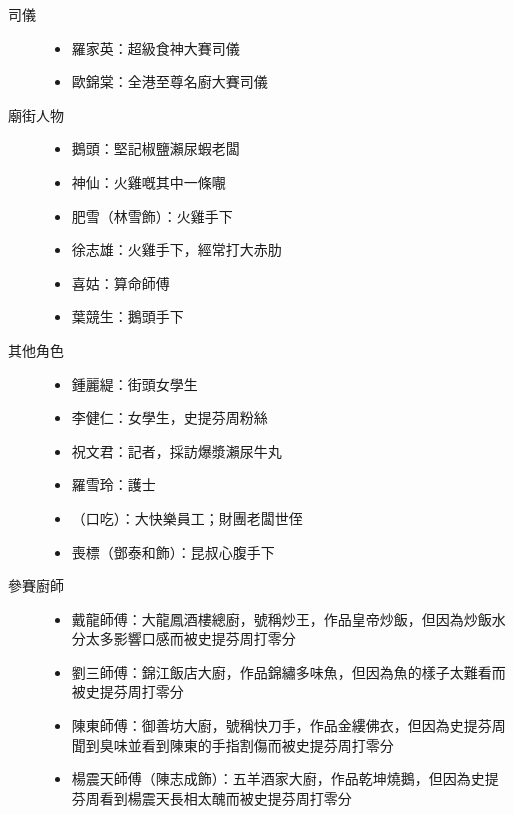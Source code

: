 \begin{description}
\item[司儀]\mbox{}\par
\begin{itemize}
\item 羅家英：超級食神大賽司儀
\item 歐錦棠：全港至尊名廚大賽司儀
\end{itemize}

\item[廟街人物]\mbox{}\par
\begin{itemize}
\item 鵝頭：堅記椒鹽瀨尿蝦老闆
\item 神仙：火雞嘅其中一條𡃁
\item 肥雪（林雪飾）：火雞手下
\item 徐志雄：火雞手下，經常打大赤肋
\item 喜姑：算命師傅
\item 葉競生：鵝頭手下
\end{itemize}

\item[其他角色]\mbox{}\par
\begin{itemize}
\item 鍾麗緹：街頭女學生
\item 李健仁：女學生，史提芬周粉絲
\item 祝文君：記者，採訪爆漿瀨尿牛丸
\item 羅雪玲：護士
\item {}（口吃）：大快樂員工；財團老闆世侄
\item 喪標（鄧泰和飾）：昆叔心腹手下
\end{itemize}

\item[參賽廚師]\mbox{}\par
\begin{itemize}
\item 戴龍師傅：大龍鳳酒樓總廚，號稱炒王，作品皇帝炒飯，但因為炒飯水分太多影響口感而被史提芬周打零分
\item 劉三師傅：錦江飯店大廚，作品錦繡多味魚，但因為魚的樣子太難看而被史提芬周打零分
\item 陳東師傅：御善坊大廚，號稱快刀手，作品金縷佛衣，但因為史提芬周聞到臭味並看到陳東的手指割傷而被史提芬周打零分
\item 楊震天師傅（陳志成飾）：五羊酒家大廚，作品乾坤燒鵝，但因為史提芬周看到楊震天長相太醜而被史提芬周打零分
\end{itemize}
\end{description}

